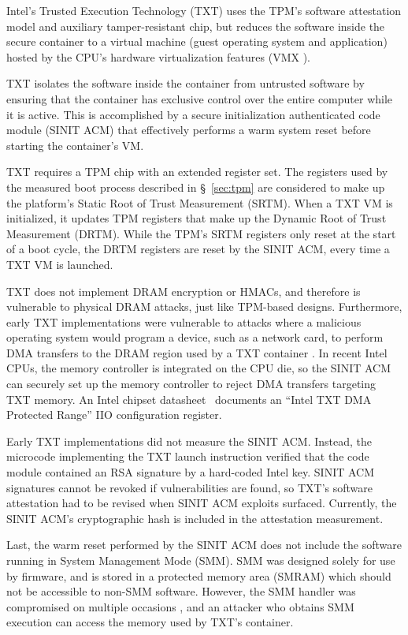 \label{sec:intel_txt}

Intel's Trusted Execution Technology (TXT) \cite{grawrock2009txt} uses the
TPM's software attestation model and auxiliary tamper-resistant chip, but
reduces the software inside the secure container to a virtual machine (guest
operating system and application) hosted by the CPU's hardware virtualization
features (VMX \cite{uhlig2005vmx}).

TXT isolates the software inside the container from untrusted software by
ensuring that the container has exclusive control over the entire computer
while it is active. This is accomplished by a secure initialization
authenticated code module (SINIT ACM) that effectively performs a warm system
reset before starting the container's VM.

TXT requires a TPM chip with an extended register set. The registers used by
the measured boot process described in \S~\ref{sec:tpm} are considered to make
up the platform's Static Root of Trust Measurement (SRTM). When a TXT VM is
initialized, it updates TPM registers that make up the Dynamic Root of Trust
Measurement (DRTM). While the TPM's SRTM registers only reset at the start of a
boot cycle, the DRTM registers are reset by the SINIT ACM, every time a TXT VM
is launched.

TXT does not implement DRAM encryption or HMACs, and therefore is vulnerable to
physical DRAM attacks, just like TPM-based designs. Furthermore, early TXT
implementations were vulnerable to attacks where a malicious operating system
would program a device, such as a network card, to perform DMA transfers
to the DRAM region used by a TXT container \cite{wojtczuk2009txt,
wojtczuk2009txt2}. In recent Intel CPUs, the memory controller is integrated on
the CPU die, so the SINIT ACM can securely set up the memory controller to
reject DMA transfers targeting TXT memory. An Intel chipset
datasheet~\cite{intel2015datasheet} documents an ``Intel TXT DMA Protected
Range'' IIO configuration register.

Early TXT implementations did not measure the SINIT ACM. Instead, the microcode
implementing the TXT launch instruction verified that the code module contained
an RSA signature by a hard-coded Intel key. SINIT ACM signatures cannot be
revoked if vulnerabilities are found, so TXT's software attestation had to be
revised when SINIT ACM exploits \cite{wojtczuk2011txt} surfaced. Currently, the
SINIT ACM's cryptographic hash is included in the attestation measurement.

Last, the warm reset performed by the SINIT ACM does not include the software
running in System Management Mode (SMM). SMM was designed solely for use by
firmware, and is stored in a protected memory area (SMRAM) which should not be
accessible to non-SMM software. However, the SMM handler was compromised on
multiple occasions \cite{duflot2006smm, rutkowska2008remap, wojtczuk2009smm,
wecherowski2009smm, embleton2010smm}, and an attacker who obtains SMM execution
can access the memory used by TXT's container.
